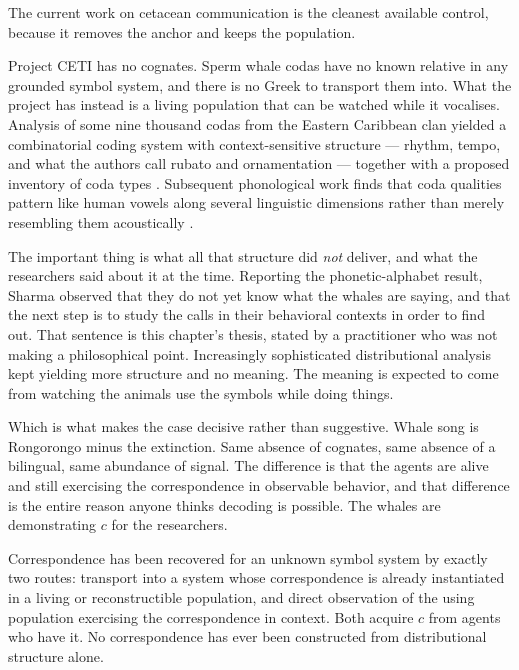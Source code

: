 The current work on cetacean communication is the cleanest
available control, because it removes the anchor and keeps the
population.

Project CETI has no cognates.
Sperm whale codas have no known relative in any grounded symbol
system, and there is no Greek to transport them into.
What the project has instead is a living population that can be
watched while it vocalises.
Analysis of some nine thousand codas from the Eastern Caribbean
clan yielded a combinatorial coding system with context-sensitive
structure --- rhythm, tempo, and what the authors call rubato and
ornamentation --- together with a proposed inventory of coda types
\cite{sharma2024}.
Subsequent phonological work finds that coda qualities pattern like
human vowels along several linguistic dimensions rather than merely
resembling them acoustically \cite{begus2026}.

The important thing is what all that structure did \emph{not}
deliver, and what the researchers said about it at the time.
Reporting the phonetic-alphabet result, Sharma observed that they
do not yet know what the whales are saying, and that the next step
is to study the calls in their behavioral contexts in order to
find out.
That sentence is this chapter's thesis, stated by a practitioner
who was not making a philosophical point.
Increasingly sophisticated distributional analysis kept yielding
more structure and no meaning.
The meaning is expected to come from watching the animals use the
symbols while doing things.

Which is what makes the case decisive rather than suggestive.
Whale song is Rongorongo minus the extinction.
Same absence of cognates, same absence of a bilingual, same
abundance of signal.
The difference is that the agents are alive and still exercising
the correspondence in observable behavior, and that difference is
the entire reason anyone thinks decoding is possible.
The whales are demonstrating $c$ for the researchers.

\begin{observation}
\label{obs:transport}
Correspondence has been recovered for an unknown symbol system by
exactly two routes: transport into a system whose correspondence is
already instantiated in a living or reconstructible population, and
direct observation of the using population exercising the
correspondence in context.
Both acquire $c$ from agents who have it.
No correspondence has ever been constructed from distributional
structure alone.
\end{observation}

